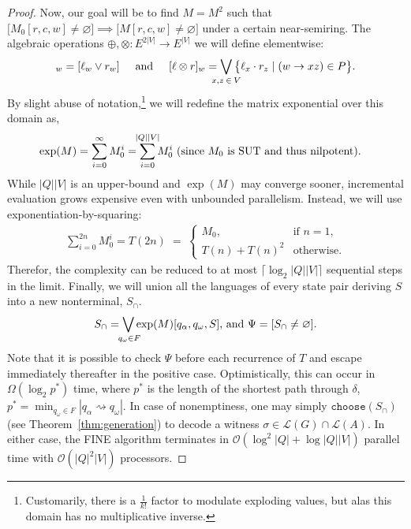 \documentclass[sigplan,review,acmsmall,nonacm,screen,anonymous]{acmart}\settopmatter{printfolios=false,printccs=false,printacmref=false}
\begin{document}
\begin{proof}[Proof]
  Now, our goal will be to find $M=M^2$ such that $\big[M_0[r, c, w] \neq \varnothing\big] \implies \big[M[r, c, w] \neq \varnothing\big]$ under a certain near-semiring. The algebraic operations $\oplus, \otimes: E^{2|V|} \rightarrow E^{|V|}$ we will define elementwise:
  \begin{equation}
    [\ell \oplus r]_w  = [\ell_w \lor r_w]\hspace{0.5cm}\text{and}\hspace{0.5cm}
    [\ell \otimes r]_w = \bigvee_{\mathclap{x, z\:\in\:V}}\big\{\ell_x \cdot r_z \mid (w \rightarrow xz) \in P\big\}.
  \end{equation}
  By slight abuse of notation,\footnote{Customarily, there is a $\frac{1}{k!}$ factor to modulate exploding values, but alas this domain has no multiplicative inverse.} we will redefine the matrix exponential over this domain as,
  \begin{align}
    \exp(M) &= \sum_{i = 0}^\infty M_0^i = \sum_{i = 0}^{\mathclap{|Q||V|}} M_0^i \text { (since $M_0$ is SUT and thus nilpotent).}
  \end{align}
  While $|Q||V|$ is an upper-bound and $\exp(M)$ may converge sooner, incremental evaluation grows expensive even with unbounded parallelism. Instead, we will use exponentiation-by-squaring:
  \begin{align}
    \sum_{i = 0}^{2n} M_0^i = T(2n) \;=\; \begin{cases}
       M_0, & \text{if } n = 1,\\
       T(n) + T(n)^2 & \text{otherwise}.
    \end{cases}
  \end{align}
  Therefor, the complexity can be reduced to at most $\lceil\log_2 |Q||V|\rceil$ sequential steps in the limit. Finally, we will union all the languages of every state pair deriving $S$ into a new nonterminal, $S_\cap$.
  \begin{align}
    S_\cap = \bigvee_{\mathclap{\:q_\omega \in F}}\exp(M)[q_\alpha, q_\omega, S] \text{, and } \Psi = [S_\cap \neq \varnothing].
  \end{align}
  Note that it is possible to check $\Psi$ before each recurrence of $T$ and escape immediately thereafter in the positive case. Optimistically, this can occur in $\Omega(\log_2 p^*)$ time, where $p^*$ is the length of the shortest path through $\delta$, $p^*=\min_{q_\omega \in F}|q_\alpha\rightsquigarrow q_\omega|$. In case of nonemptiness, one may simply $\texttt{choose}(S_\cap)$ (see Theorem~\ref{thm:generation}) to decode a witness $\sigma \in \mathcal{L}(G)\cap\mathcal{L}(A)$. In either case, the FINE algorithm terminates in $\mathcal{O}(\log^2 |Q| + \log |Q||V|)$ parallel time with $\mathcal{O}(|Q|^2|V|)$ processors.
\end{proof}\clearpage
\end{document}
